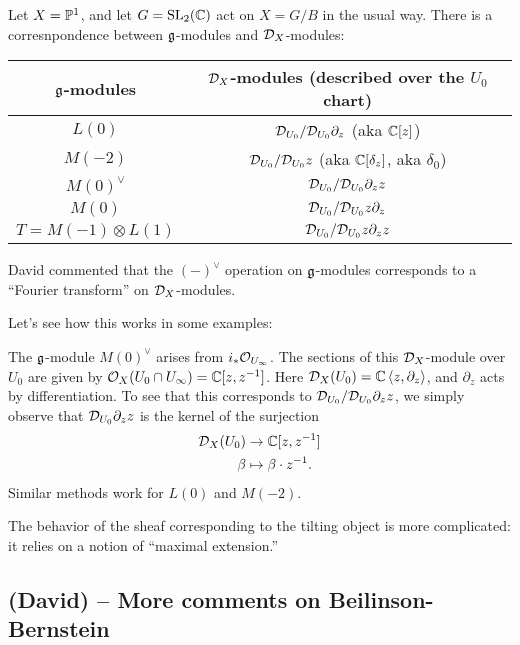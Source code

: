 \documentclass{article}
\begin{document}
Let $X = \mathbb{P}^1$, and let $G = \operatorname{SL}_2(\mathbb{C})$ act on $X = G / B$ in the usual way.
There is a corresnpondence between $\mathfrak{g}$-modules and $\mathcal{D}_X$-modules:
\begin{center}
	\begin{tabular}{|c|c|} \hline
		$\mathfrak{g}$-modules & $\mathcal{D}_X$-modules (described over the $U_0$ chart) \\ \hline
		$L(0)$ & $\mathcal{D}_{U_0} / \mathcal{D}_{U_0} \partial_z$ (aka $\mathbb{C}[z]$) \\ \hline
		$M(-2)$ & $\mathcal{D}_{U_0} / \mathcal{D}_{U_0} z$ (aka $\mathbb{C}[\delta_z]$, aka $\delta_0$) \\ \hline
		$M(0)^\vee$ & $\mathcal{D}_{U_0} / \mathcal{D}_{U_0} \partial_z z$ \\ \hline
		$M(0)$ & $\mathcal{D}_{U_0} / \mathcal{D}_{U_0} z \partial_z$ \\ \hline
		$T = M(-1) \otimes L(1)$ & $\mathcal{D}_{U_0} / \mathcal{D}_{U_0} z \partial_z z$ \\ \hline
	\end{tabular}
\end{center}

\begin{rmk}
	David commented that the $(-)^\vee$ operation on $\mathfrak{g}$-modules corresponds to a ``Fourier transform'' on $\mathcal{D}_X$-modules.
\end{rmk}

Let's see how this works in some examples:

\begin{ex}
	The $\mathfrak{g}$-module $M(0)^\vee$ arises from $i_* \mathcal{O}_{U_\infty}$.
	The sections of this $\mathcal{D}_X$-module over $U_0$ are given by $\mathcal{O}_X(U_0 \cap U_\infty) = \mathbb{C}[z, z^{-1}]$.
	Here $\mathcal{D}_X(U_0) = \mathbb{C}\left\langle z, \partial_z \right\rangle$, and $\partial_z$ acts by differentiation.
	To see that this corresponds to $\mathcal{D}_{U_0} / \mathcal{D}_{U_0} \partial_z z$, we simply observe that $\mathcal{D}_{U_0} \partial_z z$ is the kernel of the surjection
	\begin{align*}
		\mathcal{D}_X(U_0) &\to \mathbb{C}[z, z^{-1}] \\
		\beta &\mapsto \beta \cdot z^{-1}.
	\end{align*}
	Similar methods work for $L(0)$ and $M(-2)$.
\end{ex}

The behavior of the sheaf corresponding to the tilting object is more complicated: it relies on a notion of ``maximal extension.''

\subsection{(David) -- More comments on Beilinson-Bernstein}
\end{document}
